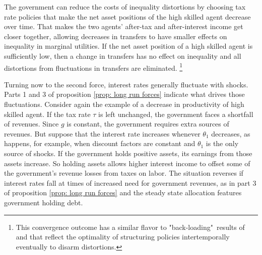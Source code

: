 \documentclass[thmsb,11pt]{article}
\begin{document}
The government can reduce the costs of  inequality distortions by choosing
tax rate policies that make the net asset positions of  the high skilled agent
decrease over time. That makes the two agents'
after-tax and after-interest income  get closer
together, allowing decreases in transfers to have smaller effects on inequality in
marginal utilities. If the net asset position of a high skilled agent is
sufficiently low, then a change in transfers has no effect on inequality and
all  distortions from fluctuations in transfers are eliminated. \footnote{This convergence outcome has
 a similar flavor to "back-loading"\ results  of
 \cite{Ray2002} and \cite{Albanesi2012} that reflect the  optimality of structuring policies intertemporally eventually to disarm  distortions.}




% 



Turning now to the second force,  interest rates generally fluctuate
with  shocks.  Parts 1 and 3 of  proposition \ref{prop: long run forces} indicate what drives those  fluctuations. Consider again the example of a
decrease in productivity of high skilled agent. If the  tax rate  $\tau $ is left unchanged,
the government faces a shortfall of revenues. Since
$g$ is constant, the
government requires  extra sources of revenues. But  suppose that
the interest rate increases whenever $\theta_1 $ decreases, as happens, for
example, when  discount factors are
constant and $\theta_1 $ is the only source of shocks. If the government holds positive assets, its earnings from those assets increase.
 So holding assets allows higher interest income
 to offset some of the government's revenue losses from taxes on labor.  The situation reverses if interest rates fall at
times of increased need for government revenues, as in
 part 3 of  proposition \ref{prop: long run forces} and the steady state allocation features government holding debt.
\end{document}
